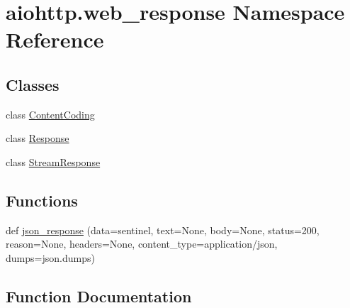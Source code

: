 \hypertarget{namespaceaiohttp_1_1web__response}{}\section{aiohttp.\+web\+\_\+response Namespace Reference}
\label{namespaceaiohttp_1_1web__response}
\subsection*{Classes}
\begin{DoxyCompactItemize}
\item 
class \hyperlink{classaiohttp_1_1web__response_1_1_content_coding}{Content\+Coding}
\item 
class \hyperlink{classaiohttp_1_1web__response_1_1_response}{Response}
\item 
class \hyperlink{classaiohttp_1_1web__response_1_1_stream_response}{Stream\+Response}
\end{DoxyCompactItemize}
\subsection*{Functions}
\begin{DoxyCompactItemize}
\item 
def \hyperlink{namespaceaiohttp_1_1web__response_ab1cff78d45fce1f002e1a850cb882237}{json\+\_\+response} (data=sentinel, text=None, body=None, status=200, reason=None, headers=None, content\+\_\+type=\textquotesingle{}application/json\textquotesingle{}, dumps=json.\+dumps)
\end{DoxyCompactItemize}


\subsection{Function Documentation}
\mbox{\label{namespaceaiohttp_1_1web__response_ab1cff78d45fce1f002e1a850cb882237}} 
